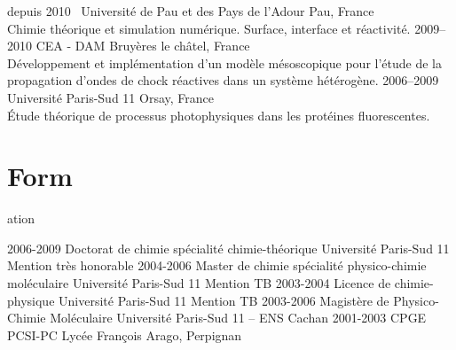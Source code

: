 \documentclass{cv-style}     %
\begin{document}
\begin{entrylist}
\entry
  {depuis 2010~}
  {Université de Pau et des Pays de l'Adour}
  {Pau, France}
  {\\
   Chimie théorique et simulation numérique.
   Surface, interface et réactivité.}
\entry
  {2009--2010}
  {CEA - DAM}
  {Bruyères le châtel, France}
  {
  \\
  Développement et implémentation d'un modèle mésoscopique pour l'étude de la propagation
  d'ondes de chock réactives dans un système hétérogène.
  }
\entry
  {2006--2009}
  {Université Paris-Sud 11}
  {Orsay, France}
  {
  \\
  Étude théorique de processus photophysiques dans les protéines fluorescentes.
  }
\end{entrylist}


\section{Form}{ation}

\begin{entrylist}
\entry
{2006-2009}
{Doctorat de chimie {\normalfont spécialité chimie-théorique}}
{Université Paris-Sud 11}
{Mention très honorable}
\entry
{2004-2006}
{Master de chimie {\normalfont spécialité physico-chimie moléculaire}}
{Université Paris-Sud 11}
{Mention TB}
\entry
{2003-2004}
{Licence de chimie-physique}
{Université Paris-Sud 11}
{Mention TB}
\entry
{2003-2006}
{Magistère de Physico-Chimie Moléculaire}
{Université Paris-Sud 11 -- ENS Cachan}
{}
\entry
{2001-2003}
{CPGE {\normalfont PCSI-PC}}
{Lycée François Arago, Perpignan}
{}
\end{entrylist}

\end{document}
